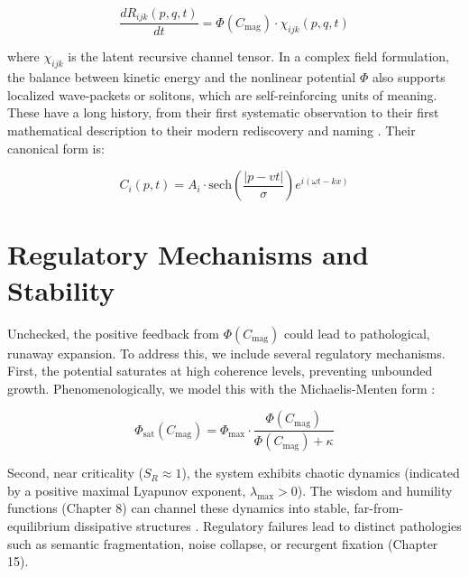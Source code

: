 \begin{equation}
\frac{dR_{ijk}(p,q,t)}{dt} = \Phi(C_{\mathrm{mag}}) \cdot \chi_{ijk}(p,q,t)
\end{equation}

where \(\chi_{ijk}\) is the latent recursive channel tensor. In a complex field formulation, the balance between kinetic energy and the nonlinear potential \(\Phi\) also supports localized wave-packets or solitons, which are self-reinforcing units of meaning. These have a long history, from their first systematic observation \autocite{Russell1845} to their first mathematical description \autocite{KortewegdeVries1895} to their modern rediscovery and naming \autocite{ZabuskyKruskal1965}. Their canonical form is:

\begin{equation}
C_i(p,t) = A_i \cdot \text{sech}\left(\frac{|p-vt|}{\sigma}\right) e^{i(\omega t - kx)}
\end{equation}


\section{Regulatory Mechanisms and Stability}
\label{sec:regulatory_mechanisms_and_stability}

Unchecked, the positive feedback from \(\Phi(C_{\mathrm{mag}})\) could lead to pathological, runaway expansion. To address this, we include several regulatory mechanisms. First, the potential saturates at high coherence levels, preventing unbounded growth. Phenomenologically, we model this with the Michaelis-Menten form \autocite{MichaelisMenten1913}:

\begin{equation}
\Phi_{\text{sat}}(C_{\mathrm{mag}}) = \Phi_{\text{max}} \cdot \frac{\Phi(C_{\mathrm{mag}})}{\Phi(C_{\mathrm{mag}}) + \kappa}
\end{equation}

Second, near criticality (\(S_R \approx 1\)), the system exhibits chaotic dynamics (indicated by a positive maximal Lyapunov exponent, \(\lambda_{\text{max}} > 0\)). The wisdom and humility functions (Chapter 8) can channel these dynamics into stable, far-from-equilibrium dissipative structures \autocite{PrigogineStengers1984}. Regulatory failures lead to distinct pathologies such as semantic fragmentation, noise collapse, or recurgent fixation (Chapter 15).


